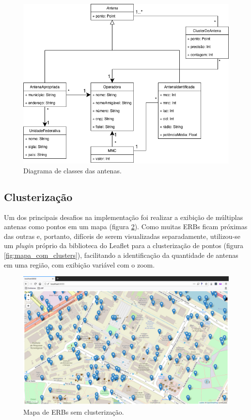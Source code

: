 \documentclass[]{politex}
\begin{document}
\begin{figure}[H]
    \centering
    \includegraphics[width=6in]{imagens/diagrama_classes_antenas}
    \caption{Diagrama de classes das antenas.}
    \label{fig:diagrama_classes_antenas}
\end{figure}

\subsection{Clusterização}

Um dos principais desafios na implementação foi realizar a exibição de múltiplas
antenas como pontos em um mapa (figura \ref{fig:mapa_sem_clusters}). Como muitas ERBs ficam próximas das outras e,
portanto, difíceis de serem visualizadas separadamente, utilizou-se um
\textit{plugin} próprio da biblioteca do Leaflet para a clusterização de pontos (figura \ref{fig:mapa_com_clusters}),
facilitando a identificação da quantidade de antenas em uma região, com exibição
variável com o zoom.

\begin{figure}[H]
    \centering
    \includegraphics[width=6in]{imagens/mapa_sem_clusters}
    \caption{Mapa de ERBs sem clusterização.}
    \label{fig:mapa_sem_clusters}
\end{figure}
\end{document}
